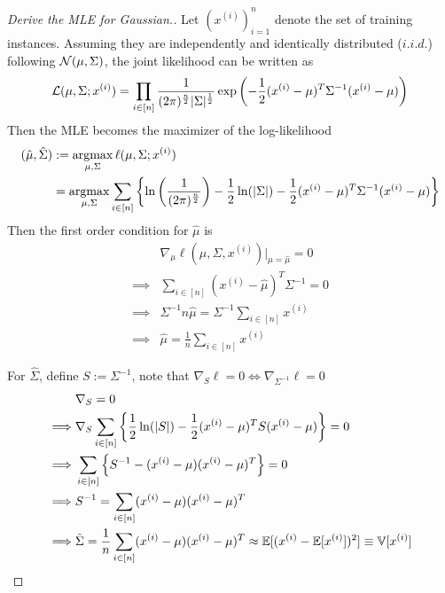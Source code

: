 \documentclass{article}
\begin{document}
\begin{example}
            \begin{proof}[Derive the MLE for Gaussian.]
                Let $\left( x^{(i)} \right)_{i=1}^n$ denote the set of training instances. Assuming they are independently and identically distributed ($i.i.d.$) following $\mathcal{{N}}(\mu, \Sigma)$, the joint likelihood can be written as
                \begin{equation}
                    \mathcal{{L}}(\mu, \Sigma; x^{(i)}) = \prod_{i \in [n]} \frac{1}{(2\pi)^{\frac{n}{2}} |\Sigma|^{\frac{1}{2}}}
                    \exp \left (
                        - \frac{1}{2} (x^{(i)} - \mu)^T \Sigma^{-1} (x^{(i)} - \mu)
                    \right )
                \end{equation}
                Then the MLE becomes the maximizer of the log-likelihood
                \begin{align}
                    (\hat{\mu}, \hat{\Sigma}) &:= \operatorname*{argmax}_{\mu, \Sigma} \ell(\mu, \Sigma; x^{(i)}) \\
                    &= \operatorname*{argmax}_{\mu, \Sigma} \sum_{i \in [n]} \left \{ 
                    \ln \left (
                        \frac{1}{(2\pi)^{\frac{n}{2}}} \right)
                    - \frac{1}{2} \ln (|\Sigma|)
                    - \frac{1}{2} (x^{(i)} - \mu)^T \Sigma^{-1} (x^{(i)} - \mu)
                    \right \}
                \end{align}
                Then the first order condition for $\hat{\mu}$ is 
                \begin{align}
                    &\nabla_\mu \ell(\mu, \Sigma, x^{(i)})|_{\mu = \hat{\mu}} = 0 \\
                    \implies& \sum_{i \in [n]} (x^{(i)} - \hat{\mu})^T \Sigma^{-1} = 0 \\
                    \implies& \Sigma^{-1} n \hat{\mu} = \Sigma^{-1} \sum_{i \in [n]} x^{(i)} \\
                    \implies& \hat{\mu} = \frac{1}{n} \sum_{i \in [n]} x^{(i)}
                \end{align}
                
                For $\hat{\Sigma}$, define $S := \Sigma^{-1}$, note that $\nabla_{S} \ell = 0 \iff \nabla_{\Sigma^{-1}} \ell = 0$
                \begin{align}
                    &\nabla_S = 0 \\
                    \implies& \nabla_S \sum_{i \in [n]} \left \{\frac{1}{2}\ln(|S|) - \frac{1}{2} (x^{(i)} - \mu)^T S (x^{(i)} - \mu) \right \} = 0\\
                    \implies& \sum_{i \in [n]} \left\{ S^{-1} - (x^{(i)} - \mu) (x^{(i)} - \mu)^T \right \} = 0 \\
                    \implies& S^{-1} = \sum_{i \in [n]} (x^{(i)} - \mu) (x^{(i)} - \mu)^T \\
                    \implies& \hat{\Sigma} = \frac{1}{n} \sum_{i \in [n]} (x^{(i)} - \mu) (x^{(i)} - \mu)^T \approx \mathbb{E}[{(x^{(i)} - \mathbb{E}[{x^{(i)}}])^2}] \equiv \mathbb{V}[{x^{(i)}}]
                \end{align}
            \end{proof}
        \end{example}
\end{document}
